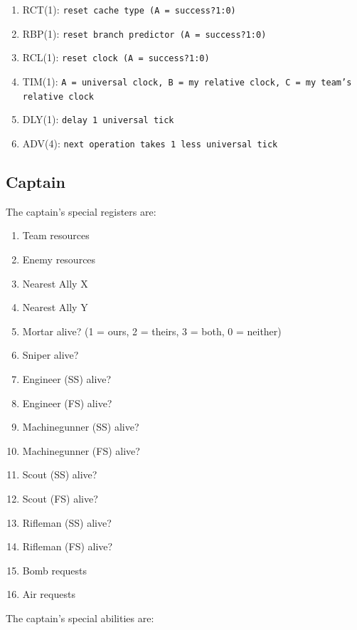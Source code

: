 \documentclass{article}
\begin{document}
\begin{enumerate}[noitemsep]
    \item RCT(1): \texttt{reset cache type (A = success?1:0)}
    \item RBP(1): \texttt{reset branch predictor (A = success?1:0)}
    \item RCL(1): \texttt{reset clock (A = success?1:0)}
    \item TIM(1): \texttt{A = universal clock, B = my relative clock, C = my
        team's relative clock}
    \item DLY(1): \texttt{delay 1 universal tick}
    \item ADV(4): \texttt{next operation takes 1 less universal tick}
\end{enumerate}

\subsection*{Captain}

The captain's special registers are:

\begin{enumerate}[noitemsep]
    \item Team resources
    \item Enemy resources
    \item Nearest Ally X
    \item Nearest Ally Y
    \item Mortar alive? (1 = ours, 2 = theirs, 3 = both, 0 = neither)
    \item Sniper alive?
    \item Engineer (SS) alive?
    \item Engineer (FS) alive?
    \item Machinegunner (SS) alive?
    \item Machinegunner (FS) alive?
    \item Scout (SS) alive?
    \item Scout (FS) alive?
    \item Rifleman (SS) alive?
    \item Rifleman (FS) alive?
    \item Bomb requests
    \item Air requests
\end{enumerate}

The captain's special abilities are:
\end{document}
